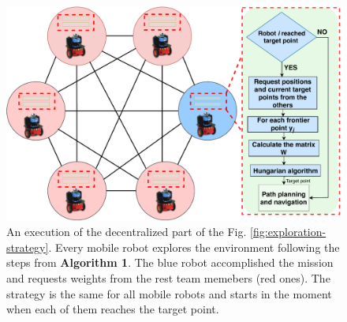 \begin{figure}[h!]
    \centering\includegraphics[width=1.0\columnwidth]{./Pictures/struktura_vol1.pdf}
	\caption{An execution of the decentralized part of the Fig. \ref{fig:exploration-strategy}. Every mobile robot explores the environment following the steps from \textbf{Algorithm 1}. The blue robot accomplished the mission and requests weights from the rest team memebers (red ones). The strategy is the same for all mobile robots and starts in the moment when each of them reaches the target point.}
   \label{fig:structure}
\end{figure}

